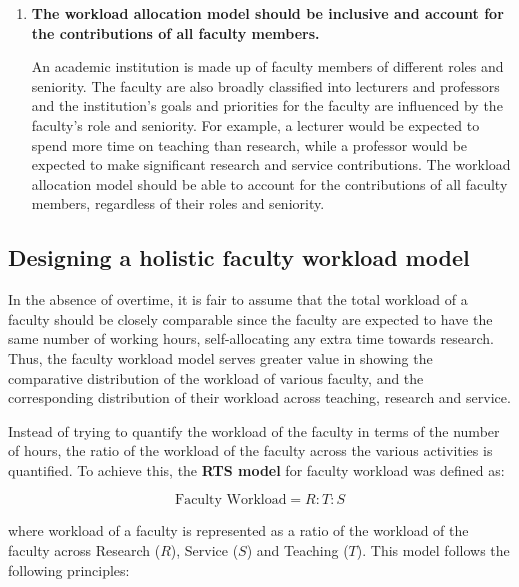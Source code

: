 \begin{enumerate}
  \item \textbf{The workload allocation model should be inclusive and account for the contributions of all faculty members.}

        An academic institution is made up of faculty members of different roles and seniority. The faculty are also broadly classified into lecturers and professors and the institution's goals and priorities for the faculty are influenced by the faculty's role and seniority. For example, a lecturer would be expected to spend more time on teaching than research, while a professor would be expected to make significant research and service contributions. The workload allocation model should be able to account for the contributions of all faculty members, regardless of their roles and seniority.

\end{enumerate}

\subsection{Designing a holistic faculty workload model}

In the absence of overtime, it is fair to assume that the total workload of a faculty should be closely comparable since the faculty are expected to have the same number of working hours, self-allocating any extra time towards research. Thus, the faculty workload model serves greater value in showing the comparative distribution of the workload of various faculty, and the corresponding distribution of their workload across teaching, research and service.

Instead of trying to quantify the workload of the faculty in terms of the number of hours, the ratio of the workload of the faculty across the various activities is quantified. To achieve this, the \textbf{RTS model} for faculty workload was defined as:

\begin{equation*}
  \text{Faculty Workload} = R:T:S
\end{equation*}

where workload of a faculty is represented as a ratio of the workload of the faculty across Research ($R$), Service ($S$) and Teaching ($T$). This model follows the following principles:

